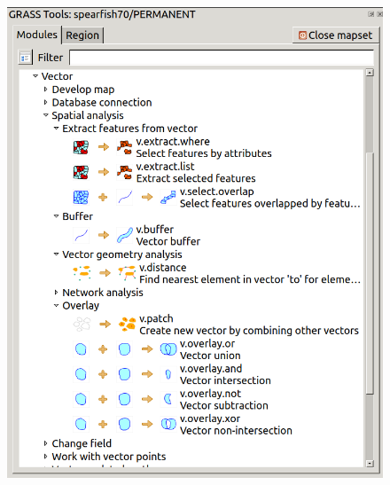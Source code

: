 \begin{figure}[htbp]
   \centering
   \includegraphics[scale=0.3]{qgis032.png}
   \caption{}
   \label{fig:qgis032}
\end{figure}

